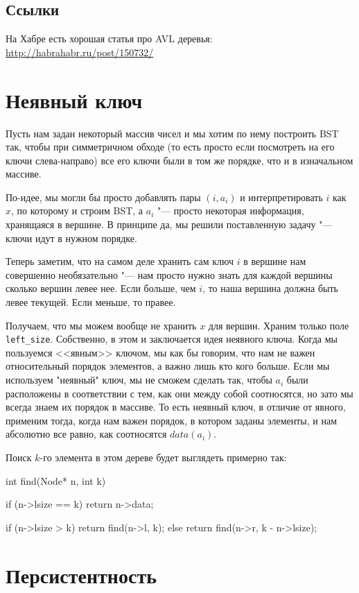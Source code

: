 \subsection{Ссылки}

На Хабре есть хорошая статья про AVL деревья:
\href{http://habrahabr.ru/post/150732/}{http://habrahabr.ru/post/150732/}

\section{Неявный ключ}

Пусть нам задан некоторый массив чисел и мы хотим по нему построить BST так, чтобы при симметричном обходе
(то есть просто если посмотреть на его ключи слева-направо) все его ключи были в том же порядке, что и в изначальном массиве.

По-идее, мы могли бы просто добавлять пары $(i, a_i)$ и интерпретировать $i$ как $x$, по которому и строим BST,
а $a_i$ "--- просто некоторая информация, хранящаяся в вершине.
В принципе да, мы решили поставленную задачу "--- ключи идут в нужном порядке.

Теперь заметим, что на самом деле хранить сам ключ $i$ в вершине нам совершенно необязательно "--- нам просто нужно знать для каждой
вершины сколько вершин левее нее. Если больше, чем $i$, то наша вершина должна быть левее текущей. Если меньше, то правее.

Получаем, что мы можем вообще не хранить $x$ для вершин. Храним только поле \verb'left_size'.
Собственно, в этом и заключается идея неявного ключа. Когда мы пользуемся <<явным>> ключом, мы как бы говорим,
что нам не важен относительный порядок элементов, а важно лишь кто кого больше.
Если мы используем "неявный" ключ, мы не сможем сделать так, чтобы $a_i$ были расположены в соответствии с тем,
как они между собой соотносятся, но зато мы всегда знаем их порядок в массиве.
То есть неявный ключ, в отличие от явного, применим тогда, когда нам важен порядок, в котором заданы элементы,
и нам абсолютно все равно, как соотносятся $data(a_i)$.

Поиск $k$-го элемента в этом дереве будет выглядеть примерно так:
\begin{cppcode}
int find(Node* n, int k) {
	if (n->lsize == k)
		return n->data;

		if (n->lsize > k)
			return find(n->l, k);
		else
			return find(n->r, k - n->lsize);
		}
\end{cppcode}

\section{Персистентность}


